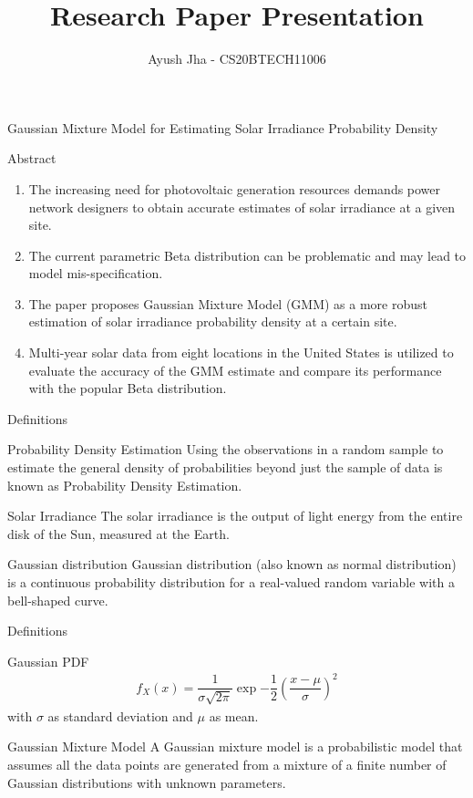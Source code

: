 \documentclass{beamer}
\title{Research Paper Presentation}
\author{Ayush Jha - CS20BTECH11006}
\providecommand{\brak}[1]{\ensuremath{\left(#1\right)}}
\begin{document}
\begin{frame}
\titlepage
\end{frame}

\begin{frame}{Gaussian Mixture Model for Estimating Solar Irradiance Probability Density}
\begin{block}{Abstract}
\begin{enumerate}
    \item The increasing need for photovoltaic generation resources 
    demands power network designers to obtain accurate estimates of solar irradiance at a given site. 
    \item The current parametric Beta distribution can be problematic and may lead to model mis-specification. 
    \item The paper proposes Gaussian Mixture Model (GMM) as a more robust estimation of solar irradiance probability density at a certain site.
    \item Multi-year solar data from eight locations in the United States is utilized to evaluate the accuracy of the GMM estimate and compare its performance with the popular Beta distribution.
\end{enumerate}
\end{block}
\end{frame}
\begin{frame}{Definitions}
    \begin{block}{Probability Density Estimation}
    Using the observations in a random sample to estimate the general density of probabilities beyond just the sample of data is known as Probability Density Estimation.
    \end{block}
    \begin{block}{Solar Irradiance }
    The solar irradiance is the output of light energy from the entire disk of the Sun, measured at the Earth. 
    \end{block}
    \begin{block}{Gaussian distribution}
    Gaussian distribution (also known as normal distribution) is a continuous probability distribution for a real-valued random variable with a  bell-shaped curve.
    \end{block}
\end{frame}
\begin{frame}{Definitions}
\begin{block}{Gaussian PDF}
 \begin{align}
        f_X(x) = \dfrac{1}{\sigma \sqrt{2\pi}}\exp{-\dfrac{1}{2} \brak{\dfrac{x-\mu}{\sigma}}^2}
    \end{align}
    with $ \sigma $ as standard deviation and $ \mu$ as mean.
\end{block}  
\begin{block}{Gaussian Mixture Model}
 A Gaussian mixture model is a probabilistic model that assumes all the data points are generated from a mixture of a finite number of Gaussian distributions with unknown parameters.
\end{block}
\end{frame}
\end{document}
